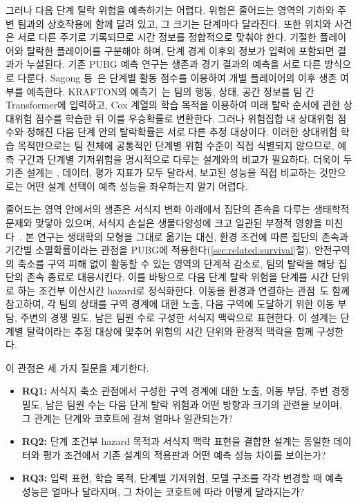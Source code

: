 그러나 다음 단계 탈락 위험을 예측하기는 어렵다.
위험은 줄어드는 영역의 기하와 주변 팀과의 상호작용에 함께 달려 있고, 그 크기는 단계마다 달라진다.
또한 위치와 사건은 서로 다른 주기로 기록되므로 시간 정보를 정합적으로 맞춰야 한다.
기절한 플레이어와 탈락한 플레이어를 구분해야 하며, 단계 경계 이후의 정보가 입력에 포함되면 결과가 누설된다.
기존 PUBG 예측 연구는 생존과 경기 결과의 예측을 서로 다른 방식으로 다룬다.
Sagong 등~\cite{Sagong25a,Sagong25b}은 단계별 활동 점수를 이용하여 개별 플레이어의 이후 생존 여부를 예측한다.
KRAFTON의 예측기~\cite{KRAFTON}는 팀의 행동, 상태, 공간 정보를 팀 간 Transformer에 입력하고, Cox 계열의 학습 목적을 이용하여 미래 탈락 순서에 관한 상대위험 점수를 학습한 뒤 이를 우승확률로 변환한다.
그러나 위험집합 내 상대위험 점수와 정해진 다음 단계 안의 탈락확률은 서로 다른 추정 대상이다.
이러한 상대위험 학습 목적만으로는 팀 전체에 공통적인 단계별 위험 수준이 직접 식별되지 않으므로, 예측 구간과 단계별 기저위험을 명시적으로 다루는 설계와의 비교가 필요하다.
더욱이 두 기존 설계는 , 데이터, 평가 지표가 모두 달라서, 보고된 성능을 직접 비교하는 것만으로는 어떤 설계 선택이 예측 성능을 좌우하는지 알기 어렵다.

줄어드는 영역 안에서의 생존은 서식지 변화 아래에서 집단의 존속을 다루는 생태학적 문제와 맞닿아 있으며, 서식지 손실은 생물다양성에 크고 일관된 부정적 영향을 미친다~\cite{Fahrig03}.
본 연구는 생태학의 모형을 그대로 옮기는 대신, 환경 조건에 따른 집단의 존속과 기간별 소멸확률이라는 관점을 PUBG에 적용한다(\ref{sec:related:survival}절).
안전구역의 축소를 구역 피해 없이 활동할 수 있는 영역의 단계적 감소로, 팀의 탈락을 해당 집단의 존속 종료로 대응시킨다.
이를 바탕으로 다음 단계 탈락 위험을 단계를 시간 단위로 하는 조건부 이산시간 hazard로 정식화한다.
이동을 환경과 연결하는 관점~\cite{Nathan08}도 함께 참고하여, 각 팀의 상태를 구역 경계에 대한 노출, 다음 구역에 도달하기 위한 이동 부담, 주변의 경쟁 밀도, 남은 팀원 수로 구성한 서식지 맥락으로 표현한다.
이 설계는 단계별 탈락이라는 추정 대상에 맞추어 위험의 시간 단위와 환경적 맥락을 함께 구성한다.

이 관점은 세 가지 질문을 제기한다.
\begin{itemize}
    \item \textbf{RQ1:}
    서식지 축소 관점에서 구성한 구역 경계에 대한 노출, 이동 부담, 주변 경쟁 밀도, 남은 팀원 수는 다음 단계 탈락 위험과 어떤 방향과 크기의 관련을 보이며, 그 관계는 단계와 코호트에 걸쳐 얼마나 일관되는가?

    \item \textbf{RQ2:}
    단계 조건부 hazard 목적과 서식지 맥락 표현을 결합한 설계는 동일한 데이터와 평가 조건에서 기존 설계의 적용판과 어떤 예측 성능 차이를 보이는가?

    \item \textbf{RQ3:}
    입력 표현, 학습 목적, 단계별 기저위험, 모델 구조를 각각 변경할 때 예측 성능은 얼마나 달라지며, 그 차이는 코호트에 따라 어떻게 달라지는가?
\end{itemize}

